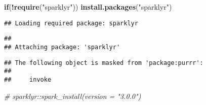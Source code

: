 \documentclass[
]{book}
\newenvironment{Shaded}{\begin{snugshade}}{\end{snugshade}}
\newcommand{\CommentTok}[1]{\textcolor[rgb]{0.56,0.35,0.01}{\textit{#1}}}
\newcommand{\ControlFlowTok}[1]{\textcolor[rgb]{0.13,0.29,0.53}{\textbf{#1}}}
\newcommand{\KeywordTok}[1]{\textcolor[rgb]{0.13,0.29,0.53}{\textbf{#1}}}
\newcommand{\NormalTok}[1]{#1}
\newcommand{\OperatorTok}[1]{\textcolor[rgb]{0.81,0.36,0.00}{\textbf{#1}}}
\newcommand{\StringTok}[1]{\textcolor[rgb]{0.31,0.60,0.02}{#1}}
\begin{document}
\begin{Shaded}
\begin{Highlighting}[]
\ControlFlowTok{if}\NormalTok{(}\OperatorTok{!}\KeywordTok{require}\NormalTok{(}\StringTok{"sparklyr"}\NormalTok{)) }\KeywordTok{install.packages}\NormalTok{(}\StringTok{"sparklyr"}\NormalTok{)}
\end{Highlighting}
\end{Shaded}

\begin{verbatim}
## Loading required package: sparklyr
\end{verbatim}

\begin{verbatim}
## 
## Attaching package: 'sparklyr'
\end{verbatim}

\begin{verbatim}
## The following object is masked from 'package:purrr':
## 
##     invoke
\end{verbatim}

\begin{Shaded}
\begin{Highlighting}[]
\CommentTok{\# sparklyr::spark\_install(version = "3.0.0")}
\end{Highlighting}
\end{Shaded}


  
\end{document}

